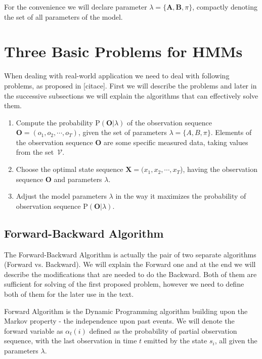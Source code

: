 \documentclass[thesis=M,english]{FITthesis}[2012/10/20]
\newcommand{\matr}[1]{\mathbf{#1}}
\begin{document}
For the convenience we will declare parameter $\lambda = \{\matr{A},\matr{B},\pi\}$, compactly denoting the set of all parameters of the model.   

\section{Three Basic Problems for HMMs}\label{sec:3p}
When dealing with real-world application we need to deal with following problems, as proposed in [citace]. First we will describe the problems and later in the successive subsections we will explain the algorithms that can effectively solve them. 

\begin{enumerate}
\item Compute the probability $\mathrm{P}(\matr{O}|\lambda) $ of the observation sequence \\ $\matr{O} = (o_1,o_2,\cdots,o_T)$, given the set of parameters $\lambda = \{A,B,\pi\}$. Elements of the observation sequence $\matr{O}$ are some specific measured data, taking values from the set~$\mathcal{V}$.   
\item Choose the optimal state sequence $\matr{X} = (x_1,x_2,\cdots,x_T$), having the observation sequence $\matr{O}$ and parameters $\lambda$.
\item Adjust the model parameters $\lambda$ in the way it maximizes the probability of observation sequence $ \mathrm{P}(\matr{O}|\lambda) $. 
\end{enumerate}


\subsection{Forward-Backward Algorithm}
The Forward-Backward Algorithm is actually the pair of two separate algorithms (Forward vs. Backward). We will explain the Forward one and at the end we will describe the modifications that are needed to do the Backward. Both of them are sufficient for solving of the first proposed problem, however we need to define both of them for the later use in the text.  

Forward Algorithm is the Dynamic Programming algorithm building upon the Markov property - the independence upon past events. We will denote the forward variable as $\alpha_t(i)$ defined as the probability of partial observation sequence, with the last observation in time $t$ emitted by the state $s_i$, all given the parameters $\lambda$.
\end{document}
